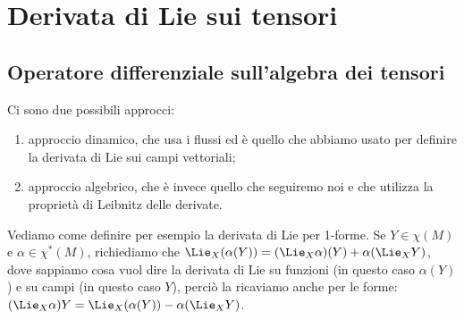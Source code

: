 \chapter{Derivata di Lie sui tensori}

\section{Operatore differenziale sull'algebra dei tensori}

Ci sono due possibili approcci:
\begin{enumerate}
	\item approccio dinamico, che usa i flussi ed è quello che abbiamo usato per definire la derivata di Lie sui campi vettoriali;
	\item approccio algebrico, che è invece quello che seguiremo noi e che utilizza la proprietà di Leibnitz delle derivate.
\end{enumerate}

\begin{example}
	Vediamo come definire per esempio la derivata di Lie per 1-forme.
	Se $Y\in\chi(M)$ e $\alpha\in\chi^*(M)$, richiediamo che $\Lie_X(\alpha ( Y)) = (\Lie_X \alpha)(Y) + \alpha(\Lie_X Y)$, dove sappiamo cosa vuol dire la derivata di Lie su funzioni (in questo caso $\alpha(Y)$) e su campi (in questo caso $Y$), perciò la ricaviamo anche per le forme: $(\Lie_X\alpha)Y = \Lie_X(\alpha(Y)) - \alpha(\Lie_XY)$.
\end{example}

